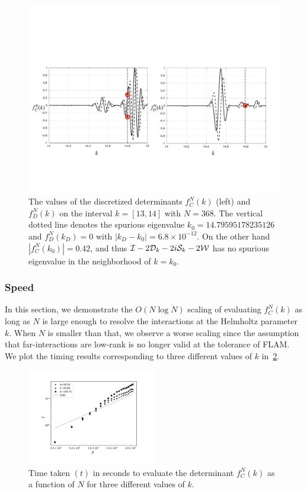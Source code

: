 \begin{figure}
\centering
\includegraphics[width=0.98\linewidth]{fig/det_spur.pdf}
\caption{The values of the discretized determinants $f_{C}^{N}(k)$ (left)
and $f_{D}^{N}(k)$ on the interval $k=[13,14]$ with $N=368$. The vertical
dotted line denotes the spurious eigenvalue $k_{0} = 14.79595178235126$ 
and $f_{D}^{N}(k_{D}) = 0$ with $|k_{D}-k_{0}|=6.8\times 10^{-12}$.
On the other hand $|f_{C}^{N}(k_{0})|=0.42$, and thus $\mathcal I-2{\mathcal D}_{k}-2i{\mathcal S}_{k} 
-2{\mathcal W}$ has no 
spurious eigenvalue in the neighborhood of $k=k_{0}$.}
\label{fig:spur}
\end{figure}

\subsubsection{Speed}
\label{subsec:speed}
In this section, we demonstrate the $O(N\log{N})$ scaling of evaluating
$f^{N}_{C}(k)$ as long as $N$ is large enough to resolve the interactions
at the Helmholtz parameter $k$. 
When $N$ is smaller than that, we observe a worse scaling since the
assumption that far-interactions are low-rank is no longer valid at
the tolerance of FLAM.
We plot the timing results corresponding to three different values of 
$k$ in~\cref{fig:speed}.
\begin{figure}
\centering
\includegraphics[width=0.5\textwidth]{fig/speed_res.pdf}
\caption{Time taken $(t)$ in seconds to evaluate the determinant $f_{C}^{N}(k)$ as
a function of $N$ for three different values of $k$.}
\label{fig:speed}
\end{figure}


